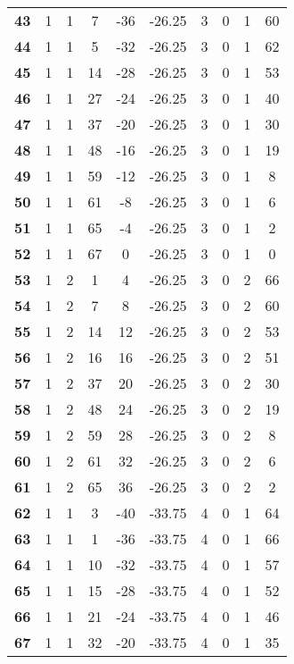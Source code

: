 \documentclass{article}%
\begin{document}
\begin{longtable}{cccccccccc}
        \textbf{43} & 1 & 1 & 7 & -36 & -26.25 & 3 & 0 & 1 & 60 \\ 
        \textbf{44} & 1 & 1 & 5 & -32 & -26.25 & 3 & 0 & 1 & 62 \\ 
        \textbf{45} & 1 & 1 & 14 & -28 & -26.25 & 3 & 0 & 1 & 53 \\ 
        \textbf{46} & 1 & 1 & 27 & -24 & -26.25 & 3 & 0 & 1 & 40 \\ 
        \textbf{47} & 1 & 1 & 37 & -20 & -26.25 & 3 & 0 & 1 & 30 \\ 
        \textbf{48} & 1 & 1 & 48 & -16 & -26.25 & 3 & 0 & 1 & 19 \\ 
        \textbf{49} & 1 & 1 & 59 & -12 & -26.25 & 3 & 0 & 1 & 8 \\ 
        \textbf{50} & 1 & 1 & 61 & -8 & -26.25 & 3 & 0 & 1 & 6 \\ 
        \textbf{51} & 1 & 1 & 65 & -4 & -26.25 & 3 & 0 & 1 & 2 \\ 
        \textbf{52} & 1 & 1 & 67 & 0 & -26.25 & 3 & 0 & 1 & 0 \\ 
        \textbf{53} & 1 & 2 & 1 & 4 & -26.25 & 3 & 0 & 2 & 66 \\ 
        \textbf{54} & 1 & 2 & 7 & 8 & -26.25 & 3 & 0 & 2 & 60 \\ 
        \textbf{55} & 1 & 2 & 14 & 12 & -26.25 & 3 & 0 & 2 & 53 \\ 
        \textbf{56} & 1 & 2 & 16 & 16 & -26.25 & 3 & 0 & 2 & 51 \\ 
        \textbf{57} & 1 & 2 & 37 & 20 & -26.25 & 3 & 0 & 2 & 30 \\ 
        \textbf{58} & 1 & 2 & 48 & 24 & -26.25 & 3 & 0 & 2 & 19 \\ 
        \textbf{59} & 1 & 2 & 59 & 28 & -26.25 & 3 & 0 & 2 & 8 \\ 
        \textbf{60} & 1 & 2 & 61 & 32 & -26.25 & 3 & 0 & 2 & 6 \\ 
        \textbf{61} & 1 & 2 & 65 & 36 & -26.25 & 3 & 0 & 2 & 2 \\ 
        \textbf{62} & 1 & 1 & 3 & -40 & -33.75 & 4 & 0 & 1 & 64 \\ 
        \textbf{63} & 1 & 1 & 1 & -36 & -33.75 & 4 & 0 & 1 & 66 \\ 
        \textbf{64} & 1 & 1 & 10 & -32 & -33.75 & 4 & 0 & 1 & 57 \\ 
        \textbf{65} & 1 & 1 & 15 & -28 & -33.75 & 4 & 0 & 1 & 52 \\ 
        \textbf{66} & 1 & 1 & 21 & -24 & -33.75 & 4 & 0 & 1 & 46 \\ 
        \textbf{67} & 1 & 1 & 32 & -20 & -33.75 & 4 & 0 & 1 & 35 \\ 

\end{longtable}
\end{document}
